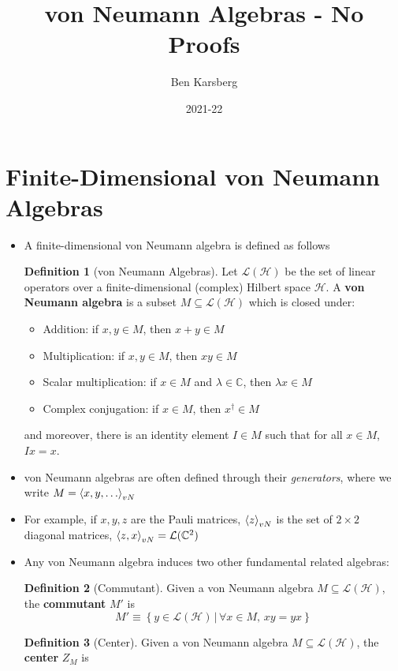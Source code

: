 \documentclass[12pt,a4paper]{article}
\title{von Neumann Algebras - No Proofs}
\author{Ben Karsberg}
\date{2021-22}
\numberwithin{equation}{section}
\newcommand{\gen}[1]{\braket{#1}_{vN}}
\theoremstyle{definition}
\newtheorem{definition}{Definition}[section]
\theoremstyle{theorem}
\theoremstyle{example}
\begin{document}
	\maketitle
	\section{Finite-Dimensional von Neumann Algebras}
	\begin{itemize}
		\item A finite-dimensional von Neumann algebra is defined as follows
		\begin{definition}[von Neumann Algebras]
			Let $\mathcal{L}(\mathcal{H})$ be the set of linear operators over a finite-dimensional (complex) Hilbert space $\mathcal{H}$. A \textbf{von Neumann algebra} is a subset $M\subseteq\mathcal{L}(\mathcal{H})$ which is closed under:
			\begin{itemize}
				\item Addition: if $x,y\in M$, then $x+y\in M$
				\item Multiplication: if $x,y\in M$, then $xy\in M$
				\item Scalar multiplication: if $x\in M$ and $\lambda\in \mathbb{C}$, then $\lambda x\in M$
				\item Complex conjugation: if $x\in M$, then $x^{\dagger}\in M$
			\end{itemize}
			and moreover, there is an identity element $I\in M$ such that for all $x\in M$, $Ix=x$.
		\end{definition}
		\item von Neumann algebras are often defined through their \textit{generators}, where we write $M=\braket{x,y,\ldots}_{vN}$
		\item For example, if $x,y,z$ are the Pauli matrices, $\gen{z}$ is the set of $2\times 2$ diagonal matrices, $\gen{z,x}=\mathcal{L}(\mathbb{C}^{2})$
		\item Any von Neumann algebra induces two other fundamental related algebras:
		\begin{definition}[Commutant]
			Given a von Neumann algebra $M\subseteq\mathcal{L}(\mathcal{H})$, the \textbf{commutant} $M'$ is
			\begin{equation}
				M'\equiv\left\{y\in\mathcal{L}(\mathcal{H})\,|\,\forall x\in M, \,xy=yx\right\}
			\end{equation}
		\end{definition}
		\begin{definition}[Center]
			Given a von Neumann algebra $M\subseteq\mathcal{L}(\mathcal{H})$, the \textbf{center} $Z_{M}$ is 

\end{definition}
\end{itemize}
\end{document}
